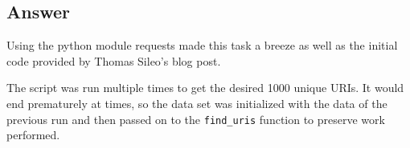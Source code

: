 \subsection{Answer}

Using the python module requests made this task a breeze as well as the initial code provided by Thomas Sileo's blog post.



The script was run multiple times to get the desired 1000 unique URIs. It would end prematurely at times, so the data set was initialized with the data of the previous run and then passed on to the {\tt find\_uris} function to preserve work performed.
